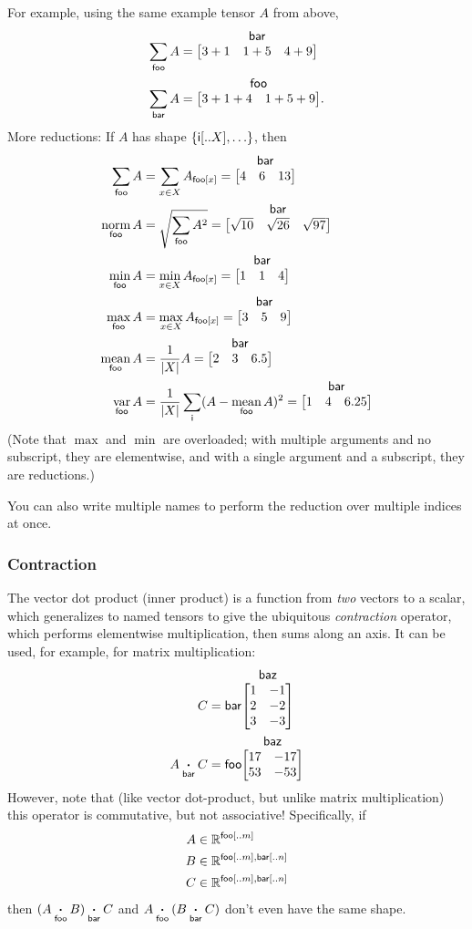 \documentclass{article}
\makeatletter
\newcommand{\tuple}[1]{\{#1\}}
\newcommand{\nmatrix}[3]{\name{#1}\begin{array}[b]{@{}c@{}}\name{#2}\\\begin{bmatrix}#3\end{bmatrix}\end{array}}
\makeatother
\begin{document}
For example, using the same example tensor $A$ from above,
\begin{align*}
\nsum{foo} A &= \nmatrix{}{bar}{
  3+1 & 1+5 & 4+9
} \\
\nsum{bar} A &= \nmatrix{}{foo}{
  3+1+4 & 1+5+9
}.
\end{align*}
More reductions: If $A$ has shape $\tuple{\nset{i}{..X}, \ldots}$, then
\begin{align*}
  \nsum{foo} A &= \sum_{x \in X} A_{\nidx{foo}{x}} = \nmatrix{}{bar}{4 & 6 & 13} \\
  \nfun{foo}{norm} A &= \sqrt{\nsum{foo} A^2} = \nmatrix{}{bar}{\sqrt{10} & \sqrt{26} & \sqrt{97}} \\
  \nfun{foo}{min} A &= \min_{x \in X} A_{\nidx{foo}{x}} = \nmatrix{}{bar}{1 & 1 & 4} \\
  \nfun{foo}{max} A &= \max_{x \in X} A_{\nidx{foo}{x}} = \nmatrix{}{bar}{3 & 5 & 9} \\
  \nfun{foo}{mean} A &= \frac{1}{|X|} A = \nmatrix{}{bar}{2 & 3 & 6.5} \\
  \nfun{foo}{var} A &= \frac1{|X|} \nsum{i} (A - \nfun{foo}{mean} A)^2 = \nmatrix{}{bar}{1 & 4 & 6.25}
\end{align*}
(Note that $\max$ and $\min$ are overloaded; with multiple arguments and no subscript, they are elementwise, and with a single argument and a subscript, they are reductions.)

You can also write multiple names to perform the reduction over multiple indices at once.

\subsubsection{Contraction}

The vector dot product (inner product) is a function from \emph{two} vectors to a scalar, which generalizes to named tensors to give the ubiquitous \emph{contraction} operator, which performs elementwise multiplication, then sums along an axis. It can be used, for example, for matrix multiplication:
\begin{align*}
C &= \nmatrix{bar}{baz}{
  1 & -1 \\ 2 & -2 \\ 3 & -3
} \\
A \ndot{bar} C &= \nmatrix{foo}{baz}{
  17 & -17 \\
  53 & -53
}
\end{align*}
However, note that (like vector dot-product, but unlike matrix multiplication) this operator is commutative, but not associative! Specifically, if
\begin{align*}
A &\in \mathbb{R}^{\mathsf{foo}[..m]} \\
B &\in \mathbb{R}^{\mathsf{foo}[..m],\mathsf{bar}[..n]} \\
C &\in \mathbb{R}^{\mathsf{foo}[..m],\mathsf{bar}[..n]}
\end{align*}
then $(A \mathbin{\mathop{\boldsymbol\cdot}\limits_{\mathsf{foo}}} B) \mathbin{\mathop{\boldsymbol\cdot}\limits_{\mathsf{bar}}} C$ and $A \mathbin{\mathop{\boldsymbol\cdot}\limits_{\mathsf{foo}}} (B \mathbin{\mathop{\boldsymbol\cdot}\limits_{\mathsf{bar}}} C)$ don't even have the same shape.
\end{document}
